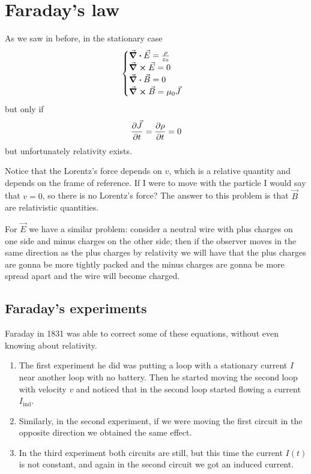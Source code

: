 \documentclass[12pt]{extarticle}
\begin{document}
\section{Faraday's law}
As we saw in before, in the stationary case
\begin{equation}
    \begin{cases}
        \div \vec E = \frac{\rho}{\varepsilon_0} \\
        \curl \vec E = 0                         \\
        \div \vec B = 0                          \\
        \curl \vec B = \mu_0 \vec J
    \end{cases}
\end{equation}
but only if
\begin{equation}
    \pdv{\vec J}{t} = \pdv{\rho}{t} = 0
\end{equation}
but unfortunately relativity exists.

Notice that the Lorentz's force depends on $v$, which is a relative quantity
and depends on the frame of reference.
If I were to move with the particle I would say that $v = 0$, so there is no Lorentz's force?
The answer to this problem is that $\vec B$ are relativistic quantities.

For $\vec E$ we have a similar problem:
consider a neutral wire with plus charges on one side and minus charges on the other side;
then if the observer moves in the same direction as the plus charges by relativity we will have that
the plus charges are gonna be more tightly packed and the minus charges are gonna be more spread apart
and the wire will become charged.

\subsection{Faraday's experiments}

Faraday in 1831 was able to correct some of these equations, without even knowing about relativity.

\begin{enumerate}
    \item
          The first experiment he did was putting a loop with a stationary current $I$ near another loop
          with no battery.
          Then he started moving the second loop with velocity $v$ and noticed that in the second loop started flowing
          a current $I_\text{ind}$.

    \item
          Similarly, in the second experiment,
          if we were moving the first circuit in the opposite direction we obtained the same effect.

    \item
          In the third experiment both circuits are still, but this time the current $I(t)$ is not constant,
          and again in the second circuit we got an induced current.
\end{enumerate}
\end{document}
